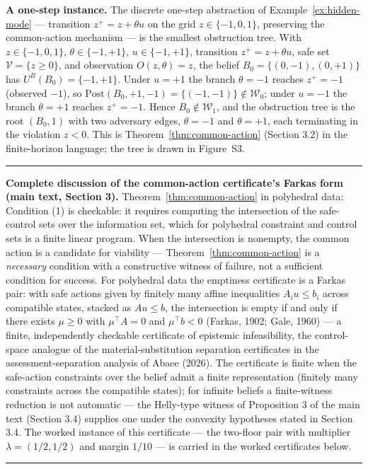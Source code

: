 \documentclass[11pt]{article}
\theoremstyle{definition}
\begin{document}
\textbf{A one-step instance.} The discrete one-step abstraction of
Example~\ref{ex:hidden-mode} --- transition \(z^+ = z + \theta u\) on
the grid \(z \in \{-1,0,1\}\), preserving the common-action mechanism
--- is the smallest obstruction tree. With
\(z\in\{-1,0,1\}\), \(\theta\in\{-1,+1\}\), \(u\in\{-1,+1\}\),
transition \(z^+=z+\theta u\), safe set \(\mathcal V=\{z\ge 0\}\), and
observation \(O(z,\theta)=z\), the belief \(B_0=\{(0,-1),(0,+1)\}\) has
\(U^B(B_0)=\{-1,+1\}\). Under \(u=+1\) the branch \(\theta=-1\) reaches
\(z^+=-1\) (observed \(-1\)), so
\(\mathrm{Post}(B_0,+1,-1)=\{(-1,-1)\}\notin\mathcal W_0\); under
\(u=-1\) the branch \(\theta=+1\) reaches \(z^+=-1\). Hence
\(B_0\notin\mathcal W_1\), and the obstruction tree is the root
\((B_0,1)\) with two adversary edges, \(\theta=-1\) and \(\theta=+1\),
each terminating in the violation \(z<0\). This is
Theorem~\ref{thm:common-action} (Section 3.2) in the finite-horizon language; the tree is drawn in Figure~S3.
\rule{0.5\linewidth}{0.5pt}

\bigskip
\noindent\textbf{Complete discussion of the common-action certificate's Farkas form (main text, Section 3).}
Theorem~\ref{thm:common-action} in polyhedral data:
Condition (1) is checkable: it requires computing the intersection of
the safe-control sets over the information set, which for polyhedral
constraint and control sets is a finite linear program. When the
intersection is nonempty, the common action is a candidate for viability
--- Theorem~\ref{thm:common-action} is a \emph{necessary} condition with a constructive
witness of failure, not a sufficient condition for success. For
polyhedral data the emptiness certificate is a Farkas pair: with safe
actions given by finitely many affine inequalities \(A_i u \le b_i\)
across compatible states, stacked as \(A u \le b\), the intersection is
empty if and only if there exists \(\mu \ge 0\) with \(\mu^{\top} A = 0\) and \(\mu^{\top} b < 0\) (Farkas, 1902;
Gale, 1960) --- a finite, independently checkable certificate of
epistemic infeasibility, the control-space analogue of the material-substitution separation certificates in the assessment-separation analysis of Abaee (2026). The certificate
is finite when the safe-action constraints over the belief admit a finite
representation (finitely many constraints across the compatible states);
for infinite beliefs a finite-witness reduction is not automatic --- the Helly-type witness of Proposition 3 of the main text (Section 3.4) supplies one under the convexity hypotheses stated in Section 3.4. The worked instance of this certificate --- the two-floor pair with multiplier \(\lambda = (1/2, 1/2)\) and margin \(1/10\) --- is carried in the worked certificates below.
\rule{0.5\linewidth}{0.5pt}
\end{document}
